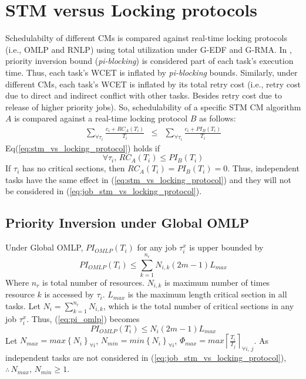 \section{STM versus Locking protocols}\label{sec:stm_vs_locking}
%
Schedulabilty of different CMs is compared against real-time locking protocols (i.e., OMLP\cite{springerlink:10.1007/s10617-012-9090-1,key-3} and RNLP\cite{6257574}) using total utilization under G-EDF and G-RMA. In  \cite{springerlink:10.1007/s10617-012-9090-1,key-3,6257574,nurtlwib}, priority inversion bound (\textit{pi-blocking}) is considered part of each task's execution time. Thus, each task's WCET is inflated by \textit{pi-blocking} bounds. Similarly, under different CMs, each
task's WCET is inflated by its total retry cost (i.e., retry cost due to direct and indirect conflict with other tasks. Besides retry cost due to release of higher priority jobs). So, schedulability of a specific STM CM algorithm $A$ is compared against a real-time
locking protocol $B$ as follows:
%
\begin{eqnarray}
\sum_{\forall\tau_{i}}\frac{c_{i}+RC_{A}(T_{i})}{T_{i}} & \le & \sum_{\forall\tau_{i}}\frac{c_{i}+PI_{B}(T_{i})}{T_{i}}\label{eq:stm_vs_locking_protocol}
\end{eqnarray}
%
Eq(\ref{eq:stm_vs_locking_protocol}) holds if 
%
\begin{equation}
\forall\tau_{i},\, RC_{A}(T_{i}) \le PI_{B}(T_{i})\label{eq:job_stm_vs_locking_protocol}
\end{equation}
%
If $\tau_{i}$ has no critical sections, then $RC_{A}(T_{i})=PI_{B}(T_{i})=0$.
Thus, independent tasks have the same effect in (\ref{eq:stm_vs_locking_protocol})
and they will not be considered in (\ref{eq:job_stm_vs_locking_protocol}).
%
\subsection{Priority Inversion under Global OMLP}\label{subsec:pi_omlp}
%
Under Global OMLP\cite{springerlink:10.1007/s10617-012-9090-1,key-3},
$PI_{OMLP}(T_{i})$ for any job $\tau_{i}^{x}$ is upper bounded by 
%
\begin{equation}
PI_{OMLP}(T_{i})\le\sum_{k=1}^{n_{r}}N_{i,k}(2m-1)L_{max}\label{eq:pi_omlp}
\end{equation}
%
Where $n_{r}$ is total number of resources. $N_{i,k}$ is maximum
number of times resource $k$ is accessed by $\tau_{i}$. $L_{max}$
is the maximum length critical section in all tasks. Let $N_{i}=\sum_{k=1}^{n_{r}}N_{i,k}$,
which is the total number of critical sections in any job $\tau_{i}^{x}$.
Thus, (\ref{eq:pi_omlp}) becomes 
\begin{equation}
PI_{OMLP}(T_{i})\le N_{i}(2m-1)L_{max}\label{eq:pi_omlp-1}
\end{equation}
Let $N_{max}=max\left\{ N_{i}\right\}_{\forall i} $, $N_{min}=min\left\{ N_{i}\right\}_{\forall i} $,
$\Phi_{max}=max\left\lceil\frac{T_i}{T_j}\right\rceil_{\forall i,\,j}$. As independent tasks are not considered in (\ref{eq:job_stm_vs_locking_protocol}),
$\therefore\, N_{max},\, N_{min}\ge1$.

